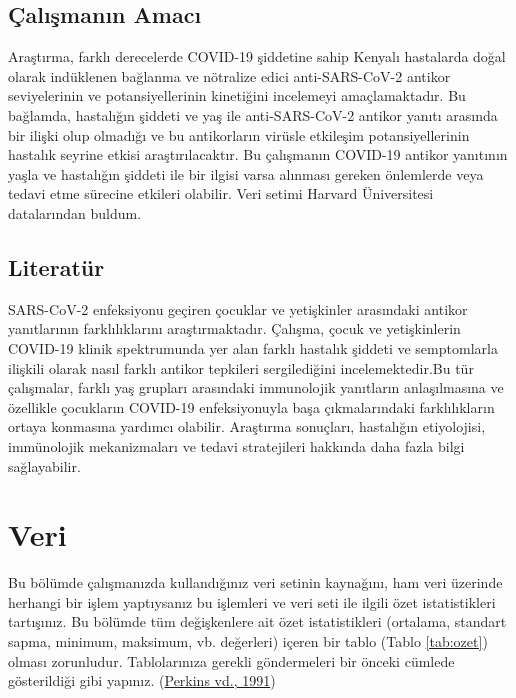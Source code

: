 \documentclass[
  12pt,
]{article}
\begin{document}
\hypertarget{uxe7alux131ux15fmanux131n-amacux131}{%
\subsection{Çalışmanın Amacı}\label{uxe7alux131ux15fmanux131n-amacux131}}

Araştırma, farklı derecelerde COVID-19 şiddetine sahip Kenyalı hastalarda doğal olarak indüklenen bağlanma ve nötralize edici anti-SARS-CoV-2 antikor seviyelerinin ve potansiyellerinin kinetiğini incelemeyi amaçlamaktadır. Bu bağlamda, hastalığın şiddeti ve yaş ile anti-SARS-CoV-2 antikor yanıtı arasında bir ilişki olup olmadığı ve bu antikorların virüsle etkileşim potansiyellerinin hastalık seyrine etkisi araştırılacaktır. Bu çalışmanın COVID-19 antikor yanıtının yaşla ve hastalığın şiddeti ile bir ilgisi varsa alınması gereken önlemlerde veya tedavi etme sürecine etkileri olabilir. Veri setimi Harvard Üniversitesi datalarından buldum.

\hypertarget{literatuxfcr}{%
\subsection{Literatür}\label{literatuxfcr}}

SARS-CoV-2 enfeksiyonu geçiren çocuklar ve yetişkinler arasındaki antikor yanıtlarının farklılıklarını araştırmaktadır. Çalışma, çocuk ve yetişkinlerin COVID-19 klinik spektrumunda yer alan farklı hastalık şiddeti ve semptomlarla ilişkili olarak nasıl farklı antikor tepkileri sergilediğini incelemektedir.Bu tür çalışmalar, farklı yaş grupları arasındaki immunolojik yanıtların anlaşılmasına ve özellikle çocukların COVID-19 enfeksiyonuyla başa çıkmalarındaki farklılıkların ortaya konmasına yardımcı olabilir. Araştırma sonuçları, hastalığın etiyolojisi, immünolojik mekanizmaları ve tedavi stratejileri hakkında daha fazla bilgi sağlayabilir.

\hypertarget{veri}{%
\section{Veri}\label{veri}}

Bu bölümde çalışmanızda kullandığınız veri setinin kaynağını, ham veri üzerinde herhangi bir işlem yaptıysanız bu işlemleri ve veri seti ile ilgili özet istatistikleri tartışınız. Bu bölümde tüm değişkenlere ait özet istatistikleri (ortalama, standart sapma, minimum, maksimum, vb. değerleri) içeren bir tablo (Tablo \ref{tab:ozet}) olması zorunludur. Tablolarınıza gerekli göndermeleri bir önceki cümlede gösterildiği gibi yapınız. (\protect\hyperlink{ref-perkins:1991}{Perkins vd., 1991})
\end{document}
